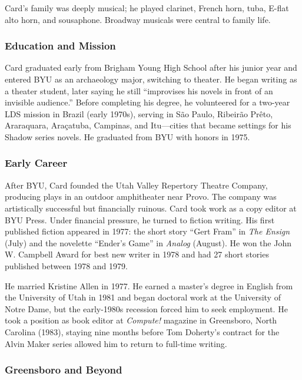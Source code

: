 \documentclass[11pt,letterpaper]{article}
\begin{document}
Card's family was deeply musical; he played clarinet, French horn, tuba, E-flat alto horn, and sousaphone. Broadway musicals were central to family life.

\subsubsection{Education and Mission}

Card graduated early from Brigham Young High School after his junior year and entered BYU as an archaeology major, switching to theater. He began writing as a theater student, later saying he still ``improvises his novels in front of an invisible audience.'' Before completing his degree, he volunteered for a two-year LDS mission in Brazil (early 1970s), serving in S\~{a}o Paulo, Ribeir\~{a}o Pr\^{e}to, Araraquara, Araçatuba, Campinas, and Itu---cities that became settings for his Shadow series novels. He graduated from BYU with honors in 1975.

\subsubsection{Early Career}

After BYU, Card founded the Utah Valley Repertory Theatre Company, producing plays in an outdoor amphitheater near Provo. The company was artistically successful but financially ruinous. Card took work as a copy editor at BYU Press. Under financial pressure, he turned to fiction writing. His first published fiction appeared in 1977: the short story ``Gert Fram'' in \textit{The Ensign} (July) and the novelette ``Ender's Game'' in \textit{Analog} (August). He won the John W. Campbell Award for best new writer in 1978 and had 27 short stories published between 1978 and 1979.

He married Kristine Allen in 1977. He earned a master's degree in English from the University of Utah in 1981 and began doctoral work at the University of Notre Dame, but the early-1980s recession forced him to seek employment. He took a position as book editor at \textit{Compute!} magazine in Greensboro, North Carolina (1983), staying nine months before Tom Doherty's contract for the Alvin Maker series allowed him to return to full-time writing.

\subsubsection{Greensboro and Beyond}
\end{document}
